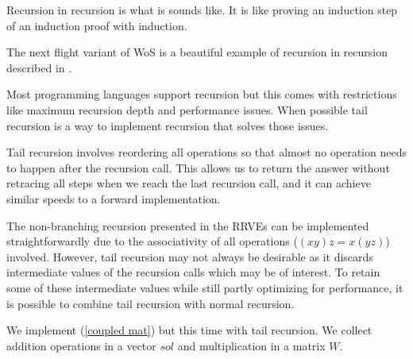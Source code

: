 \documentclass[a4paper,12pt]{article}
\begin{document}
\begin{pythonn} 
\end{pythonn}

\begin{technique}
    Recursion in recursion is what is sounds like. It is like proving an induction
    step of an induction proof with induction.
\end{technique}


\begin{related}
    The next flight variant of WoS
    is a beautiful example of recursion in recursion described in
    \cite{sawhney_grid-free_2022}.
\end{related}

Most programming languages support recursion but this comes with restrictions
like maximum recursion depth and performance issues. When possible tail recursion is
a way to implement recursion that solves those
issues.

\begin{technique}
    Tail recursion involves reordering all operations
    so that almost no operation needs to happen after
    the recursion call. This allows us to return the
    answer without retracing all steps when we reach
    the last recursion call, and it can achieve similar
    speeds to a forward implementation.
\end{technique}

The non-branching recursion presented in the RRVEs
can be implemented straightforwardly due to the associativity of
all operations ($(xy)z = x(yz)$) involved. However, tail recursion
may not always be desirable as it discards intermediate values of
the recursion calls which may be of interest. To retain some of these intermediate
values while still partly optimizing for performance, it is possible
to combine tail recursion with normal recursion.

\begin{pythonn}
    We implement (\ref{coupled mat}) but this time with tail recursion.
    We collect addition operations in a vector $sol$ and multiplication
    in a matrix $W$.
    \vspace{0.3cm}
\end{pythonn}
\end{document}

